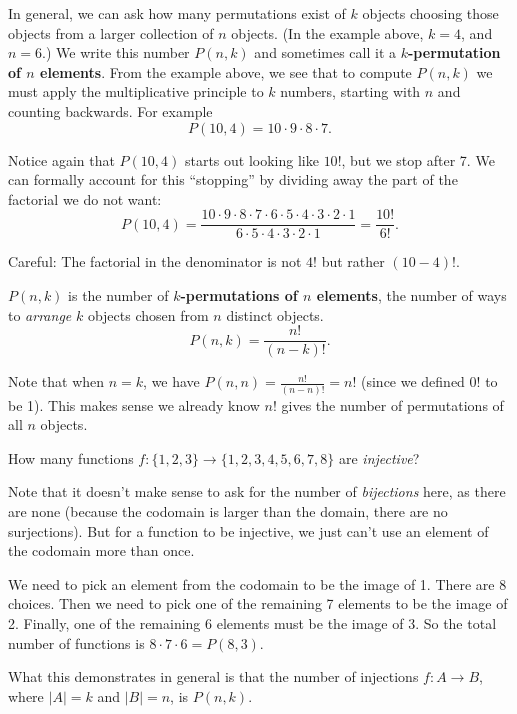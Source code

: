 \documentclass[11pt,]{book}
\newcommand{\terminology}[1]{\textbf{#1}}
\theoremstyle{ptxplainnotitle}
\theoremstyle{ptxplaintitle}
\theoremstyle{ptxdefinitionnotitle}
\theoremstyle{ptxdefinitiontitle}
\theoremstyle{ptxdefinitionnotitle}
\theoremstyle{ptxdefinitiontitle}
\theoremstyle{ptxdefinitionnotitle}
\theoremstyle{ptxdefinitiontitle}
\theoremstyle{ptxdefinitiontitlenonumber}
\theoremstyle{ptxdefinitiontitlenonumber}
\numberwithin{equation}{chapter}
\newcommand{\card}[1]{\left| #1 \right|}
\begin{document}
\hypertarget{p-1467}{}%
In general, we can ask how many permutations exist of \(k\) objects choosing those objects from a larger collection of \(n\) objects. (In the example above, \(k = 4\), and \(n = 6\).) We write this number \(P(n,k)\) and sometimes call it a \terminology{\(k\)-permutation of \(n\) elements}. From the example above, we see that to compute \(P(n,k)\) we must apply the multiplicative principle to \(k\) numbers, starting with \(n\) and counting backwards. For example%
\begin{equation*}
P(10, 4) = 10\cdot 9 \cdot 8 \cdot 7.
\end{equation*}
%
\par
\hypertarget{p-1468}{}%
Notice again that \(P(10,4)\) starts out looking like \(10!\), but we stop after 7. We can formally account for this ``stopping'' by dividing away the part of the factorial we do not want:%
\begin{equation*}
P(10,4) = \frac{10\cdot 9 \cdot 8 \cdot 7 \cdot 6 \cdot 5 \cdot 4 \cdot 3 \cdot 2 \cdot 1}{6 \cdot 5 \cdot 4 \cdot 3 \cdot 2 \cdot 1} = \frac{10!}{6!}.
\end{equation*}
%
\par
\hypertarget{p-1469}{}%
Careful: The factorial in the denominator is not \(4!\) but rather \((10-4)!\).%
\begin{assemblage}\label{assemblage-22}
\hypertarget{p-1470}{}%
 \(P(n,k)\) is the number of \terminology{\(k\)-permutations of \(n\) elements}, the number of ways to \emph{arrange} \(k\) objects chosen from \(n\) distinct objects.%
\begin{equation*}
P(n,k) = \frac{n!}{(n-k)!}.
\end{equation*}
%
\end{assemblage}
\hypertarget{p-1471}{}%
Note that when \(n = k\), we have \(P(n,n) = \frac{n!}{(n-n)!} = n!\) (since we defined \(0!\) to be 1). This makes sense \textemdash{}we already know \(n!\) gives the number of permutations of all \(n\) objects.%
\begin{example}\label{example-counting-functions-injective}
\hypertarget{p-1472}{}%
How many functions \(f:\{1,2,3\} \to \{1,2,3,4,5,6,7,8\}\) are \emph{injective}?%
\par\smallskip%
\noindent\textbf{}\hypertarget{solution-189}{}\hypertarget{p-1473}{}%
Note that it doesn't make sense to ask for the number of \emph{bijections} here, as there are none (because the codomain is larger than the domain, there are no surjections). But for a function to be injective, we just can't use an element of the codomain more than once.%
\par
\hypertarget{p-1474}{}%
We need to pick an element from the codomain to be the image of 1. There are 8 choices. Then we need to pick one of the remaining 7 elements to be the image of 2. Finally, one of the remaining 6 elements must be the image of 3. So the total number of functions is \(8\cdot 7 \cdot 6 = P(8,3)\).%
\par
\hypertarget{p-1475}{}%
What this demonstrates in general is that the number of injections \(f:A \to B\), where \(\card{A} = k\) and \(\card{B} = n\), is \(P(n,k)\).%
\end{example}
\end{document}
